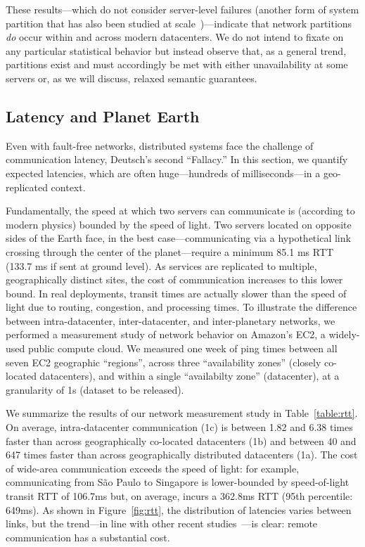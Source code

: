 These results---which do not consider server-level failures (another
form of system partition that has also been studied at
scale~\cite{google-availability})---indicate that network partitions
\textit{do} occur within and across modern datacenters. We do not
intend to fixate on any particular statistical behavior but instead
observe that, as a general trend, partitions exist and must
accordingly be met with either unavailability at some servers or, as
we will discuss, relaxed semantic guarantees.

\subsection{Latency and Planet Earth}

Even with fault-free networks, distributed systems face the challenge
of communication latency, Deutsch's second ``Fallacy.'' In this
section, we quantify expected latencies, which are often
huge---hundreds of milliseconds---in a geo-replicated context.

Fundamentally, the speed at which two servers can communicate is
(according to modern physics) bounded by the speed of light. Two
servers located on opposite sides of the Earth face, in the best
case---communicating via a hypothetical link crossing through the
center of the planet---require a minimum 85.1 ms RTT (133.7 ms if sent
at ground level). As services are replicated to multiple,
geographically distinct sites, the cost of communication increases to
this lower bound. In real deployments, transit times are actually
slower than the speed of light due to routing, congestion, and
processing times. To illustrate the difference between
intra-datacenter, inter-datacenter, and inter-planetary networks, we
performed a measurement study of network behavior on Amazon's EC2, a
widely-used public compute cloud. We measured one week of ping times
between all seven EC2 geographic ``regions'', across three
``availability zones'' (closely co-located datacenters), and within a
single ``availabilty zone'' (datacenter), at a granularity of 1s
(dataset to be released).

We summarize the results of our network measurement study in
Table~\ref{table:rtt}. On average, intra-datacenter communication (1c)
is between 1.82 and 6.38 times faster than across geographically
co-located datacenters (1b) and between 40 and 647 times faster than
across geographically distributed datacenters (1a). The cost of
wide-area communication exceeds the speed of light: for example,
communicating from S\~{a}o Paulo to Singapore is lower-bounded by
speed-of-light transit RTT of 106.7ms but, on average, incurs a
362.8ms RTT (95th percentile: 649ms). As shown in
Figure~\ref{fig:rtt}, the distribution of latencies varies between
links, but the trend---in line with other recent studies~\cite{mdcc,
  redblue}---is clear: remote communication has a substantial cost.

